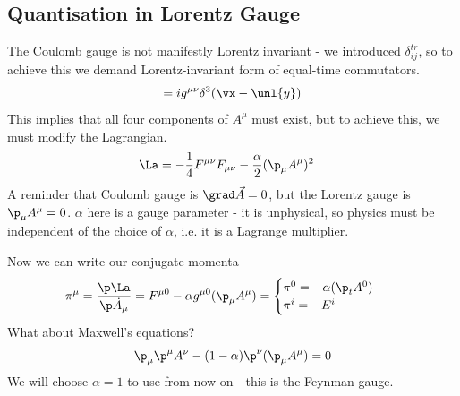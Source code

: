 \documentclass[a4paper, 11pt, normalem]{report}
\newcommand\hpi{\hat{\pi}}
\newcommand\vy{\unl{y}}
\begin{document}
\chapter{}
\section{Quantisation in Lorentz Gauge}
The Coulomb gauge is not manifestly Lorentz invariant - we introduced $\delta_{ij}^{tr}$, so to achieve this we demand Lorentz-invariant form of equal-time commutators.
\begin{align}
    [\hat{A}^\mu(\vx,t),\hpi^\nu(\vy,t)] = ig^{\mu\nu}\delta^3(\vx-\vy)
\end{align}
This implies that all four components of $A^\mu$ must exist, but to achieve this, we must modify the Lagrangian.
\begin{align}
    \La &= -\frac14F^{\mu\nu}F_{\mu\nu} - \frac{\alpha}{2}(\p_\mu A^\mu)^2
\end{align}
A reminder that Coulomb gauge is $\grad\vec{A} = 0$, but the Lorentz gauge is $\p_\mu A^\mu = 0$.
$\alpha$ here is a gauge parameter - it is unphysical, so physics must be independent of the choice of $\alpha$, i.e. it is a Lagrange multiplier.

Now we can write our conjugate momenta
\begin{align}
    \pi^\mu &= \frac{\p\La}{\p\dot{A}_\mu} = F^{\mu 0} - \alpha g^{\mu 0}(\p_\mu A^\mu) = \begin{cases} \pi^0 = -\alpha(\p_tA^0) & \\ \pi^i = -E^i & \end{cases} 
\end{align}
What about Maxwell's equations?
\begin{align}
    \p_\mu\p^\mu A^\nu - (1-\alpha)\p^\nu(\p_\mu A^\mu) = 0
\end{align}
We will choose $\alpha=1$ to use from now on - this is the Feynman gauge. 
\end{document}
